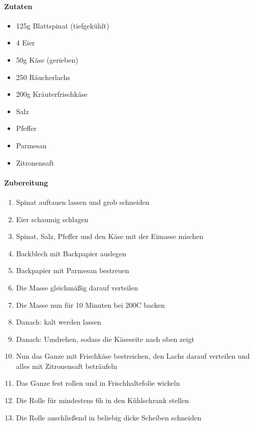 \newpage
{}

\paragraph{Zutaten}
\begin{itemize}[noitemsep]
	\item 125g Blattspinat (tiefgekühlt)
	\item 4 Eier
	\item 50g Käse (gerieben)
	\item 250 Räucherlachs
	\item 200g Kräuterfrischkäse
	\item Salz
	\item Pfeffer
	\item Parmesan
	\item Zitronensaft
\end{itemize}


\paragraph{Zubereitung}
\begin{enumerate}[noitemsep]
	\item Spinat auftauen lassen und grob schneiden
	\item Eier schaumig schlagen
	\item Spinat, Salz, Pfeffer und den Käse mit der Eimasse mischen
	\item Backblech mit Backpapier auslegen
	\item Backpapier mit Parmesan bestreuen
	\item Die Masse gleichmäßig darauf verteilen
	\item Die Masse nun für 10 Minuten bei 200\textdegree C backen
	\item Danach: kalt werden lassen
	\item Danach: Umdrehen, sodass die Käseseite nach oben zeigt
	\item Nun das Ganze mit Frischkäse bestreichen, den Lachs darauf verteilen und alles mit Zitronensaft beträufeln
	\item Das Ganze fest rollen und in Frischhaltefolie wickeln 
	\item Die Rolle für mindestens 6h in den Kühlschrank stellen
	\item Die Rolle anschließend in beliebig dicke Scheiben schneiden
\end{enumerate}